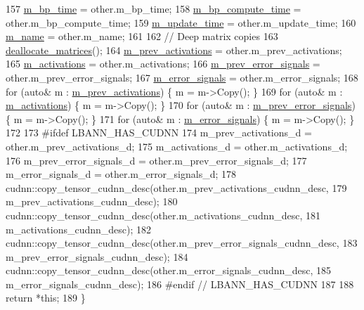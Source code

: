 \begin{DoxyCode}
157   \hyperlink{classlbann_1_1Layer_aa60fc41627bcaa9c345775bf5737bb45}{m\_bp\_time} = other.m\_bp\_time;
158   \hyperlink{classlbann_1_1Layer_ae28626457a58943b25e7a2920fc271f0}{m\_bp\_compute\_time} = other.m\_bp\_compute\_time;
159   \hyperlink{classlbann_1_1Layer_ab7d84533662b02d01ba6685ad6f20935}{m\_update\_time} = other.m\_update\_time;
160   \hyperlink{classlbann_1_1Layer_aa47109ad09b399142fa92f9d3702189f}{m\_name} = other.m\_name;
161 
162   \textcolor{comment}{// Deep matrix copies}
163   \hyperlink{classlbann_1_1Layer_a888392d6ac6906093a8125c6a37de075}{deallocate\_matrices}();
164   \hyperlink{classlbann_1_1Layer_a52314601c3458268f56e017dc2ade357}{m\_prev\_activations}   = other.m\_prev\_activations;
165   \hyperlink{classlbann_1_1Layer_a7caf08e938141d1584e6939cefa4baed}{m\_activations}        = other.m\_activations;
166   \hyperlink{classlbann_1_1Layer_a6fdcbf884150d0b20cffe678fefd7caa}{m\_prev\_error\_signals} = other.m\_prev\_error\_signals;
167   \hyperlink{classlbann_1_1Layer_a452e22ac81c1a799f0614b3e942ea726}{m\_error\_signals}      = other.m\_error\_signals;
168   \textcolor{keywordflow}{for} (\textcolor{keyword}{auto}& m : \hyperlink{classlbann_1_1Layer_a52314601c3458268f56e017dc2ade357}{m\_prev\_activations})   \{ m = m->Copy(); \}
169   \textcolor{keywordflow}{for} (\textcolor{keyword}{auto}& m : \hyperlink{classlbann_1_1Layer_a7caf08e938141d1584e6939cefa4baed}{m\_activations})        \{ m = m->Copy(); \}
170   \textcolor{keywordflow}{for} (\textcolor{keyword}{auto}& m : \hyperlink{classlbann_1_1Layer_a6fdcbf884150d0b20cffe678fefd7caa}{m\_prev\_error\_signals}) \{ m = m->Copy(); \}
171   \textcolor{keywordflow}{for} (\textcolor{keyword}{auto}& m : \hyperlink{classlbann_1_1Layer_a452e22ac81c1a799f0614b3e942ea726}{m\_error\_signals})      \{ m = m->Copy(); \}
172 
173 \textcolor{preprocessor}{#ifdef LBANN\_HAS\_CUDNN}
174   m\_prev\_activations\_d = other.m\_prev\_activations\_d;
175   m\_activations\_d = other.m\_activations\_d;
176   m\_prev\_error\_signals\_d = other.m\_prev\_error\_signals\_d;
177   m\_error\_signals\_d = other.m\_error\_signals\_d;
178   cudnn::copy\_tensor\_cudnn\_desc(other.m\_prev\_activations\_cudnn\_desc,
179                                 m\_prev\_activations\_cudnn\_desc);
180   cudnn::copy\_tensor\_cudnn\_desc(other.m\_activations\_cudnn\_desc,
181                                 m\_activations\_cudnn\_desc);
182   cudnn::copy\_tensor\_cudnn\_desc(other.m\_prev\_error\_signals\_cudnn\_desc,
183                                 m\_prev\_error\_signals\_cudnn\_desc);
184   cudnn::copy\_tensor\_cudnn\_desc(other.m\_error\_signals\_cudnn\_desc,
185                                 m\_error\_signals\_cudnn\_desc);
186 \textcolor{preprocessor}{#endif // LBANN\_HAS\_CUDNN}
187 
188   \textcolor{keywordflow}{return} *\textcolor{keyword}{this};
189 \}
\end{DoxyCode}
